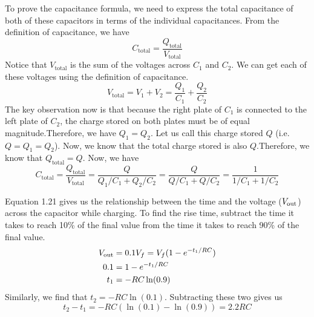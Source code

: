 \documentclass{article}
\begin{document}
    To prove the capacitance formula, we need to express the total capacitance of both of these capacitors in terms of the individual capacitances. From the definition of capacitance, we have 
    \[C_\text{total} = \frac{Q_\text{total}}{V_\text{total}}\]
    Notice that $V_\text{total}$ is the sum of the voltages across $C_1$ and $C_2$. We can get each of these voltages using the definition of capacitance.
    \[V_\text{total} = V_1 + V_2 = \frac{Q_1}{C_1} + \frac{Q_2}{C_2}\]
    The key observation now is that because the right plate of $C_1$ is connected to the left plate of $C_2$, the charge stored on both plates must be of equal magnitude.\footnotemark Therefore, we have $Q_1 = Q_2$. Let us call this charge stored $Q$ (i.e. $Q = Q_1 = Q_2$). Now, we know that the total charge stored is also $Q$.\footnotemark Therefore, we know that $Q_\text{total} = Q$. Now, we have 
    \[C_\text{total} = \frac{Q_\text{total}}{V_\text{total}} = \frac{Q}{Q_1/C_1 + Q_2/C_2} = \frac{Q}{Q/C_1 + Q/C_2} = \frac{1}{1/C_1 + 1/C_2}\]



    Equation 1.21 gives us the relationship between the time and the voltage ($V_{\text{out}}$) across the capacitor while charging. To find the rise time, subtract the time it takes to reach 10\% of the final value from the time it takes to reach 90\% of the final value.
    \begin{align*}
        V_{\text{out}} &= 0.1V_f = V_f(1-e^{-t_1/RC}) \\
        0.1 &= 1 - e^{-t_1/RC}\\ 
        t_1 &= -RC \ln(0.9)
    \end{align*}
    Similarly, we find that $t_2 = -RC \ln(0.1)$. Subtracting these two gives us 
    \[t_2 - t_1 = -RC(\ln(0.1) - \ln(0.9)) = 2.2RC\]
\end{document}
